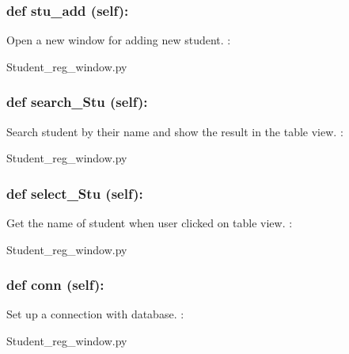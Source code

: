 \hypertarget{class_poly_a14a7ad77ce612b0c54f531d307ee4b39}{
\subsubsection[{def stu_add (self):}]{\setlength{\rightskip}{0pt plus 5cm}def {stu\_add} (self):}}\label{class_poly_a14a7ad77ce612b0c54f531d307ee4b39}
Open a new window for adding new student.
:\begin{DoxyCompactItemize}
\item 
Student\_reg\_window.\-py\end{DoxyCompactItemize}

\hypertarget{class_poly_a14a7ad77ce612b0c54f531d307ee4b39}{
\subsubsection[{def search_Stu (self):}]{\setlength{\rightskip}{0pt plus 5cm}def {search\_Stu} (self):}}\label{class_poly_a14a7ad77ce612b0c54f531d307ee4b39}
Search student by their name and show the result in the table view.
:\begin{DoxyCompactItemize}
\item 
Student\_reg\_window.\-py\end{DoxyCompactItemize}

\hypertarget{class_poly_a14a7ad77ce612b0c54f531d307ee4b39}{
\subsubsection[{def select_Stu (self):}]{\setlength{\rightskip}{0pt plus 5cm}def {select\_Stu} (self):}}\label{class_poly_a14a7ad77ce612b0c54f531d307ee4b39}
Get the name of student when user clicked on table view.
:\begin{DoxyCompactItemize}
\item 
Student\_reg\_window.\-py\end{DoxyCompactItemize}

\hypertarget{class_poly_a14a7ad77ce612b0c54f531d307ee4b39}{
\subsubsection[{def conn (self):}]{\setlength{\rightskip}{0pt plus 5cm}def {conn} (self):}}\label{class_poly_a14a7ad77ce612b0c54f531d307ee4b39}
Set up a connection with database.
:\begin{DoxyCompactItemize}
\item 
Student\_reg\_window.\-py\end{DoxyCompactItemize}

